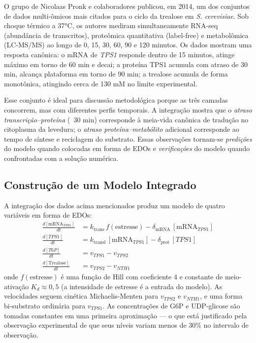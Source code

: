 O grupo de Nicolaas Pronk e colaboradores publicou, em 2014, um dos
conjuntos de dados multi-ômicos mais citados para o ciclo da trealose em
\textit{S. cerevisiae}. Sob choque térmico a 37°C, os autores mediram
simultaneamente RNA-seq (abundância de transcritos), proteômica
quantitativa (label-free) e metabolômica (LC-MS/MS) ao longo de 0, 15, 30,
60, 90 e 120 minutos. Os dados mostram uma resposta canônica: o
mRNA de \textit{TPS1} responde dentro de 15 minutos, atinge máximo em torno de
60 min e decai; a proteína TPS1 acumula com atraso de 30 min, alcança
plataforma em torno de 90 min; a trealose acumula de forma monotônica,
atingindo cerca de 130 mM no limite experimental.

Esse conjunto é ideal para discussão metodológica porque as três camadas
concorrem, mas com diferentes perfis temporais. A integração mostra que o
\emph{atraso transcrição--proteína} (~30 min) corresponde à meia-vida
canônica de tradução no citoplasma da levedura; o \emph{atraso
proteína--metabólito} adicional corresponde ao tempo de síntese e
reciclagem do substrato. Essas observações tornam-se \emph{predições} do
modelo quando colocadas em forma de EDOs e \emph{verificações} do modelo
quando confrontadas com a solução numérica.

\subsection{Construção de um Modelo Integrado}
\label{sub:image11-modelo}

A integração dos dados acima mencionados produz um modelo de quatro
variáveis em forma de EDOs:
\begin{align}
\frac{d[\mathrm{mRNA}_{TPS1}]}{dt} &= k_{\text{trans}}\, f(\text{estresse})
                                     - \delta_{\text{mRNA}}\,[\mathrm{mRNA}_{TPS1}] \\
\frac{d[TPS1]}{dt}               &= k_{\text{transl}}\,[\mathrm{mRNA}_{TPS1}]
                                     - \delta_{\text{prot}}\,[TPS1] \\
\frac{d[T6P]}{dt}                &= v_{TPS1} - v_{TPS2} \\
\frac{d[\mathrm{Trealose}]}{dt}  &= v_{TPS2} - v_{NTH1}
\end{align}
onde $f(\text{estresse})$ é uma função de Hill com coeficiente 4 e
constante de meio-ativação $K_d \approx 0{,}5$ (a intensidade de
estresse é a entrada do modelo). As velocidades seguem cinética Michaelis-Menten
para $v_{TPS2}$ e $v_{NTH1}$, e uma forma bi-substrato ordinária para
$v_{TPS1}$. As concentrações de G6P e UDP-glicose são tomadas constantes em
uma primeira aproximação --- o que está justificado pela observação
experimental de que seus níveis variam menos de 30\% no intervalo de
observação.

